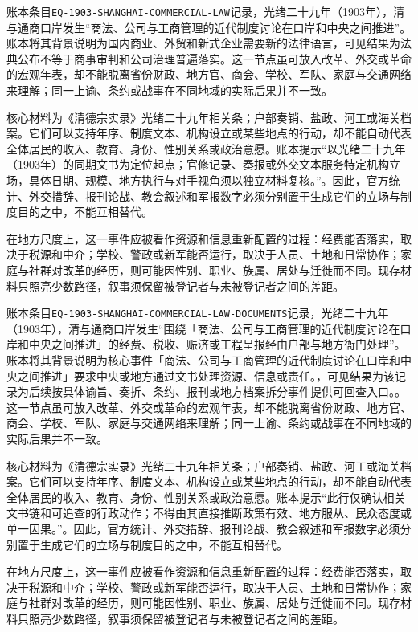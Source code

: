 账本条目\texttt{EQ-1903-SHANGHAI-COMMERCIAL-LAW}记录，光绪二十九年（1903年），清与通商口岸发生“商法、公司与工商管理的近代制度讨论在口岸和中央之间推进”。账本将其背景说明为国内商业、外贸和新式企业需要新的法律语言，可见结果为法典公布不等于商事审判和公司治理普遍落实。这一节点虽可放入改革、外交或革命的宏观年表，却不能脱离省份财政、地方官、商会、学校、军队、家庭与交通网络来理解；同一上谕、条约或战事在不同地域的实际后果并不一致。

核心材料为《清德宗实录》光绪二十九年相关条；户部奏销、盐政、河工或海关档案。它们可以支持年序、制度文本、机构设立或某些地点的行动，却不能自动代表全体居民的收入、教育、身份、性别关系或政治意愿。账本提示“以光绪二十九年（1903年）的同期文书为定位起点；官修记录、奏报或外交文本服务特定机构立场，具体日期、规模、地方执行与对手视角须以独立材料复核。”。因此，官方统计、外交措辞、报刊论战、教会叙述和军报数字必须分别置于生成它们的立场与制度目的之中，不能互相替代。

在地方尺度上，这一事件应被看作资源和信息重新配置的过程：经费能否落实，取决于税源和中介；学校、警政或新军能否运行，取决于人员、土地和日常协作；家庭与社群对改革的经历，则可能因性别、职业、族属、居处与迁徙而不同。现存材料只照亮少数路径，叙事须保留被登记者与未被登记者之间的差距。

账本条目\texttt{EQ-1903-SHANGHAI-COMMERCIAL-LAW-DOCUMENTS}记录，光绪二十九年（1903年），清与通商口岸发生“围绕「商法、公司与工商管理的近代制度讨论在口岸和中央之间推进」的经费、税收、赈济或工程呈报经由户部与地方衙门处理”。账本将其背景说明为核心事件「商法、公司与工商管理的近代制度讨论在口岸和中央之间推进」要求中央或地方通过文书处理资源、信息或责任。，可见结果为该记录为后续按具体谕旨、奏折、条约、报刊或地方档案拆分事件提供可回查入口。。这一节点虽可放入改革、外交或革命的宏观年表，却不能脱离省份财政、地方官、商会、学校、军队、家庭与交通网络来理解；同一上谕、条约或战事在不同地域的实际后果并不一致。

核心材料为《清德宗实录》光绪二十九年相关条；户部奏销、盐政、河工或海关档案。它们可以支持年序、制度文本、机构设立或某些地点的行动，却不能自动代表全体居民的收入、教育、身份、性别关系或政治意愿。账本提示“此行仅确认相关文书链和可追查的行政动作；不得由其直接推断政策有效、地方服从、民众态度或单一因果。”。因此，官方统计、外交措辞、报刊论战、教会叙述和军报数字必须分别置于生成它们的立场与制度目的之中，不能互相替代。

在地方尺度上，这一事件应被看作资源和信息重新配置的过程：经费能否落实，取决于税源和中介；学校、警政或新军能否运行，取决于人员、土地和日常协作；家庭与社群对改革的经历，则可能因性别、职业、族属、居处与迁徙而不同。现存材料只照亮少数路径，叙事须保留被登记者与未被登记者之间的差距。

